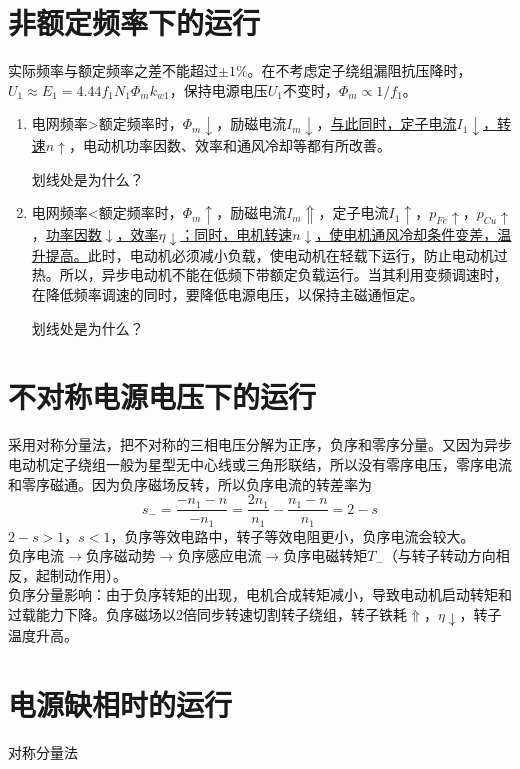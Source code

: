 \documentclass[blue]{elegantnote}
\begin{document}
\section{非额定频率下的运行}
实际频率与额定频率之差不能超过{\color{thid}$\pm1\%$}。{\color{blue}在不考虑定子绕组漏阻抗压降时}，$U_1\approx E_1=4.44f_1N_1\Phi_mk_{w1}$，保持电源电压$U_1$不变时，$\Phi_m\propto 1/f_1$。
\begin{enumerate}
	\item 电网频率>额定频率时，$\Phi_m\downarrow$，励磁电流$I_m \downarrow$，\underline{与此同时，定子电流$I_1\downarrow$，转速$n\uparrow$}，电动机功率因数、效率和通风冷却等都有所改善。
	\begin{note}
		{\color{main1}划线处是为什么？}
	\end{note}
	\item 电网频率<额定频率时，$\Phi_m\uparrow$，励磁电流$I_m \Uparrow$，定子电流$I_1\uparrow$，$p_{Fe}\uparrow$，$p_{Cu}\uparrow$，\underline{功率因数$\downarrow$，效率$\eta\downarrow$；同时，电机转速$n\downarrow$，使电机通风冷却条件变差，温升提高。}此时，电动机必须减小负载，使电动机在轻载下运行，防止电动机过热。所以，异步电动机不能在低频下带额定负载运行。当其利用变频调速时，在降低频率调速的同时，要降低电源电压，以保持主磁通恒定。
	\begin{note}
		{\color{main1}划线处是为什么？}
	\end{note}
\end{enumerate}
\section{不对称电源电压下的运行}
采用{\color{thid}对称分量法}，把不对称的三相电压分解为正序，负序和零序分量。又因为异步电动机定子绕组一般为星型无中心线或三角形联结，{\color{thid}所以没有零序电压，零序电流和零序磁通}。因为负序磁场反转，所以负序电流的转差率为$$s_{-}=\frac{-n_1-n}{-n_1}=\frac{2n_1}{n_1}-\frac{n_1-n}{n_1}=2-s$$
$2-s>1$，$s<1$，负序等效电路中，转子等效电阻更小，负序电流会较大。\\负序电流$\rightarrow$负序磁动势$\rightarrow$负序感应电流$\rightarrow$负序电磁转矩$T_{-}$（与转子转动方向相反，起制动作用）。\\
负序分量影响：由于负序转矩的出现，电机合成转矩减小，导致电动机启动转矩和过载能力下降。负序磁场以2倍同步转速切割转子绕组，转子铁耗$\Uparrow$，$\eta\downarrow$，转子温度升高。
\section{电源缺相时的运行}
对称分量法
\end{document}
